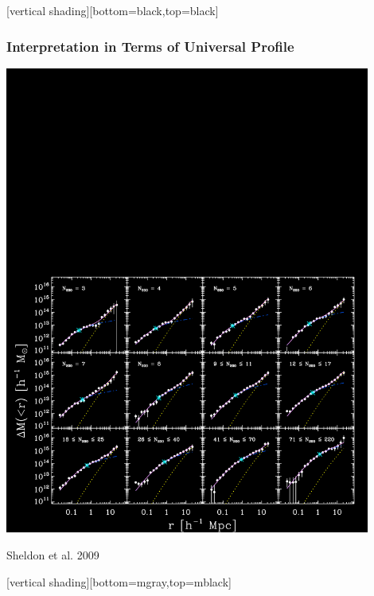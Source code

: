 \documentclass{beamer}
\begin{document}
{
    [vertical shading][bottom=black,top=black]


    \frame
    {
        \frametitle{Interpretation in Terms of Universal Profile}

        \begin{center}
            \includegraphics[trim=20 0 50 800,clip,width=0.9\textwidth]{m2l-ngals200_12-m21-22-l4-massfits-icolor.png}
        \end{center}
        \hfill {\color{gold} Sheldon et al. 2009}
    }

    [vertical shading][bottom=mgray,top=mblack]
}
\end{document}
